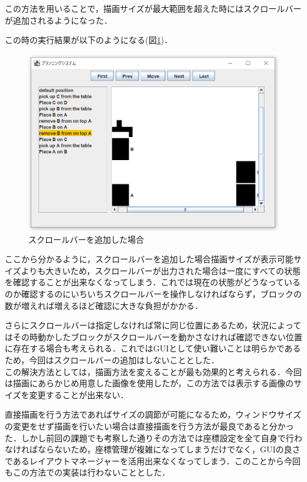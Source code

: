 \documentclass[12pt]{jarticle}
\begin{document}
この方法を用いることで，描画サイズが最大範囲を超えた時にはスクロールバーが追加されるようになった．

\clearpage

この時の実行結果が以下のようになる(図\ref{fig:tryScroll})．\\

\begin{figure}[htbp]
  \begin{center}
    \includegraphics[scale=0.8]{images/tryScroll.PNG}
    \caption{スクロールバーを追加した場合}
    \label{fig:tryScroll}
  \end{center}
\end{figure}


ここから分かるように，スクロールバーを追加した場合描画サイズが表示可能サイズよりも大きいため，スクロールバーが出力された場合は一度にすべての状態を確認することが出来なくなってしまう．これでは現在の状態がどうなっているのか確認するのにいちいちスクロールバーを操作しなければならず，ブロックの数が増えれば増えるほど確認に大きな負担がかかる．\par
さらにスクロールバーは指定しなければ常に同じ位置にあるため，状況によってはその時動かしたブロックがスクロールバーを動かさなければ確認できない位置に存在する場合も考えられる．これではGUIとして使い難いことは明らかであるため，今回はスクロールバーの追加はしないこととした．\\

この解決方法としては，描画方法を変えることが最も効果的と考えられる．今回は描画にあらかじめ用意した画像を使用したが，この方法では表示する画像のサイズを変更することが出来ない．\par
直接描画を行う方法であればサイズの調節が可能になるため，ウィンドウサイズの変更をせず描画を行いたい場合は直接描画を行う方法が最良であると分かった．しかし前回の課題でも考察した通りその方法では座標設定を全て自身で行わなければならないため，座標管理が複雑になってしまうだけでなく，GUIの良さであるレイアウトマネージャーを活用出来なくなってしまう．このことから今回もこの方法での実装は行わないこととした．\\
\end{document}
